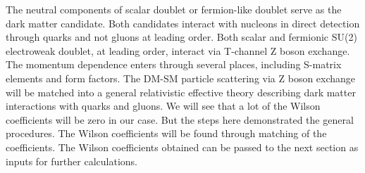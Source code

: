 \documentclass[12pt]{article}
\begin{document}


The neutral components of scalar doublet or fermion-like doublet serve as the dark matter candidate. Both candidates interact with nucleons in direct detection through quarks and not gluons at leading order. 
Both scalar and fermionic SU(2) electroweak doublet, at leading order, interact via T-channel Z boson exchange. The momentum dependence enters through several places, including S-matrix elements and form factors. 
The DM-SM particle scattering via Z boson exchange will be matched into a general relativistic effective theory describing dark matter interactions with quarks and gluons. We will see that a lot of the Wilson coefficients will be zero in our case. But the steps here demonstrated the general procedures. The Wilson coefficients will be found through matching of the coefficients. The Wilson coefficients obtained can be passed to the next section as inputs for further calculations. 
\end{document}
